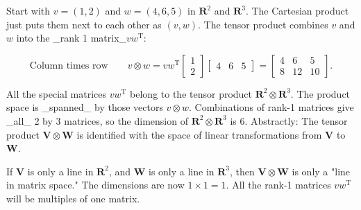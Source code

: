 Start with \(v=(1,2)\) and \(w=(4,6,5)\) in \(\mathbf{R}^{2}\) and \(\mathbf{R}^{3}\). The Cartesian product just puts them next to each other as \((v,w)\). The tensor product combines \(v\) and \(w\) into the _rank 1 matrix_\(vw^{\mathrm{T}}\):

\[\text{Column times row}\qquad v\otimes w=vw^{\mathrm{T}}\begin{bmatrix}1\\ 2\end{bmatrix}\begin{bmatrix}4&6&5\end{bmatrix}=\begin{bmatrix}4&6&5\\ 8&12&10\end{bmatrix}.\]

All the special matrices \(vw^{\mathrm{T}}\) belong to the tensor product \(\mathbf{R}^{2}\otimes\mathbf{R}^{3}\). The product space is _spanned_ by those vectors \(v\otimes w\). Combinations of rank-1 matrices give _all_ 2 by 3 matrices, so the dimension of \(\mathbf{R}^{2}\otimes\mathbf{R}^{3}\) is 6. Abstractly: The tensor product \(\mathbf{V}\otimes\mathbf{W}\) is identified with the space of linear transformations from \(\mathbf{V}\) to \(\mathbf{W}\).

If \(\mathbf{V}\) is only a line in \(\mathbf{R}^{2}\), and \(\mathbf{W}\) is only a line in \(\mathbf{R}^{3}\), then \(\mathbf{V}\otimes\mathbf{W}\) is only a "line in matrix space." The dimensions are now \(1\times 1=1\). All the rank-1 matrices \(vw^{\mathrm{T}}\) will be multiples of one matrix.

